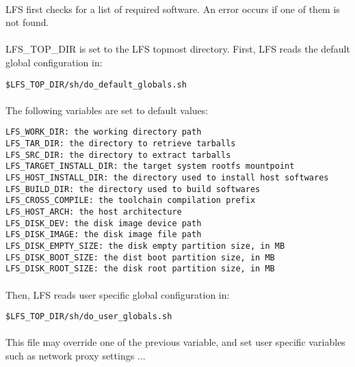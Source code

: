 \documentclass[a4paper, 11pt]{article}
\begin{document}
\paragraph{}
LFS first checks for a list of required software. An error occurs if one of them
is not found.

\paragraph{}
LFS\_TOP\_DIR is set to the LFS topmost directory. First, LFS reads the default
global configuration in:\\

\begin{lstlisting}[frame=tb]
$LFS_TOP_DIR/sh/do_default_globals.sh
\end{lstlisting}

\paragraph{}
The following variables are set to default values:\\
\begin{lstlisting}[frame=tb]
LFS_WORK_DIR: the working directory path
LFS_TAR_DIR: the directory to retrieve tarballs
LFS_SRC_DIR: the directory to extract tarballs
LFS_TARGET_INSTALL_DIR: the target system rootfs mountpoint
LFS_HOST_INSTALL_DIR: the directory used to install host softwares
LFS_BUILD_DIR: the directory used to build softwares
LFS_CROSS_COMPILE: the toolchain compilation prefix
LFS_HOST_ARCH: the host architecture
LFS_DISK_DEV: the disk image device path
LFS_DISK_IMAGE: the disk image file path
LFS_DISK_EMPTY_SIZE: the disk empty partition size, in MB
LFS_DISK_BOOT_SIZE: the dist boot partition size, in MB
LFS_DISK_ROOT_SIZE: the disk root partition size, in MB
\end{lstlisting}

\paragraph{}
Then, LFS reads user specific global configuration in:\\

\begin{lstlisting}[frame=tb]
$LFS_TOP_DIR/sh/do_user_globals.sh
\end{lstlisting}

\paragraph{}
This file may override one of the previous variable, and set user specific
variables such as network proxy settings ...
\end{document}
